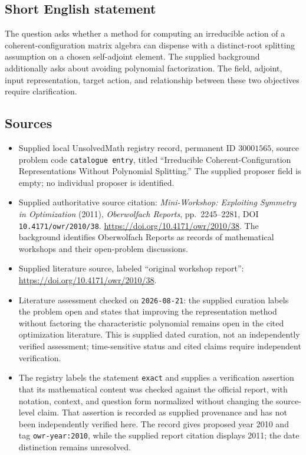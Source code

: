 \documentclass[11pt]{article}
\begin{document}
\subsection{Short English statement}
The question asks whether a method for computing an irreducible action of a coherent-configuration matrix algebra can dispense with a distinct-root splitting assumption on a chosen self-adjoint element. The supplied background additionally asks about avoiding polynomial factorization. The field, adjoint, input representation, target action, and relationship between these two objectives require clarification.
\subsection{Sources}
\begin{itemize}
\item Supplied local UnsolvedMath registry record, permanent ID \(30001565\), source problem code \texttt{catalogue entry}, titled ``Irreducible Coherent-Configuration Representations Without Polynomial Splitting.'' The supplied proposer field is empty; no individual proposer is identified.
\item Supplied authoritative source citation: \emph{Mini-Workshop: Exploiting Symmetry in Optimization} (2011), \emph{Oberwolfach Reports}, pp.\ 2245--2281, DOI \texttt{10.4171/owr/2010/38}. \url{https://doi.org/10.4171/owr/2010/38}. The background identifies Oberwolfach Reports as records of mathematical workshops and their open-problem discussions.
\item Supplied literature source, labeled ``original workshop report'': \url{https://doi.org/10.4171/owr/2010/38}.
\item Literature assessment checked on \texttt{2026-08-21}: the supplied curation labels the problem open and states that improving the representation method without factoring the characteristic polynomial remains open in the cited optimization literature. This is supplied dated curation, not an independently verified assessment; time-sensitive status and cited claims require independent verification.
\item The registry labels the statement \texttt{exact} and supplies a verification assertion that its mathematical content was checked against the official report, with notation, context, and question form normalized without changing the source-level claim. That assertion is recorded as supplied provenance and has not been independently verified here. The record gives proposed year 2010 and tag \texttt{owr-year:2010}, while the supplied report citation displays 2011; the date distinction remains unresolved.
\end{itemize}
\end{document}
